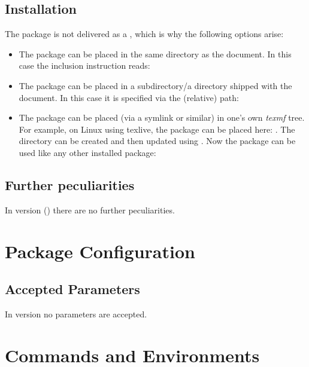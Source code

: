 \documentclass{sopra-base}
\begin{document}
\subsection{Installation}
    The package is not delivered as a , which is why the
    following options arise:
    \begin{itemize}
        \item The package can be placed in the same directory as the
                document. In this case the inclusion instruction reads:
\begin{plainlatex}
\usepackage{sopra-standard}
\end{plainlatex}
        \item The package can be placed in a subdirectory/a directory
                shipped with the document. In this case it is specified
                via the (relative) path:
\begin{plainlatex}
\usepackage{./My/Path/to/sopra-standard}
\end{plainlatex}
        \item The package can be placed (via a symlink or similar)
              in one's own \emph{texmf} tree.
              For example, on Linux using texlive,
              the package can be placed here: .
              The directory can be created and then updated using
              . Now
              the package can be used like any other installed package:
\begin{plainlatex}
\usepackage{sopra-standard}
\end{plainlatex}
    \end{itemize}

\subsection{Further peculiarities}
In version \thesosversion{} () there are no further
peculiarities.

\section{Package Configuration}
    \subsection{Accepted Parameters}
    In version \thesosversion{} no parameters are accepted.

\section{Commands and Environments}
\end{document}
